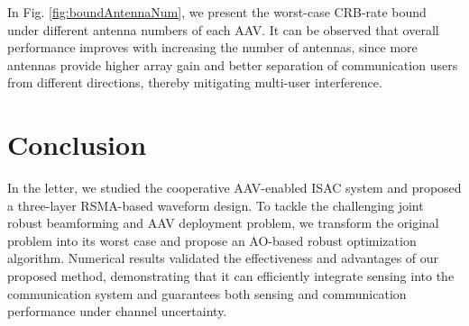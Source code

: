 \documentclass[twocolumn,journal]{IEEEtran}
\begin{document}
In Fig. \ref{fig:boundAntennaNum}, we present the worst-case CRB-rate bound under different antenna numbers of each AAV. It can be observed that overall performance improves with increasing the number of antennas, since more antennas provide higher array gain and better separation of communication users from different directions, thereby mitigating multi-user interference. 
\section{Conclusion}
In the letter, we studied the cooperative AAV-enabled ISAC system and proposed a three-layer RSMA-based waveform design. To tackle the challenging joint robust beamforming and AAV deployment problem, we transform the original problem into its worst case and propose an AO-based robust optimization algorithm. Numerical results validated the effectiveness and advantages of our proposed method, demonstrating that it can efficiently integrate sensing into the communication system and guarantees both sensing and communication performance under channel uncertainty.

\printbibliography 
\end{document}
